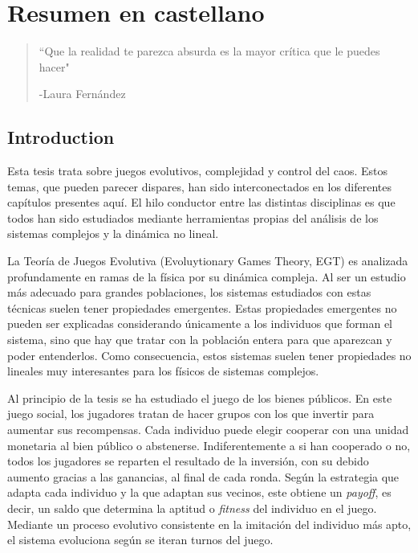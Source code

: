 \chapter{Resumen en castellano}



\begin{quotation}
	\vspace{-3cm}
    \begin{flushright}
    \begin{minipage}[t][5cm][b]{0.5\textwidth}
    { ``Que la realidad te parezca absurda es la mayor crítica que le puedes hacer"}
    
    \bigskip
    
    -{\small  Laura Fernández}
    \end{minipage}
    \end{flushright}
    
    \vspace{0.5cm}
\end{quotation}




\section{Introduction}

Esta tesis trata sobre juegos evolutivos, complejidad y control del caos. Estos temas, que pueden parecer dispares, han sido interconectados en los diferentes capítulos presentes aquí. El hilo conductor entre las distintas disciplinas es que todos han sido estudiados mediante herramientas propias del análisis de los sistemas complejos y la dinámica no lineal. 

La Teoría de Juegos Evolutiva (Evoluytionary Games Theory, EGT) es analizada profundamente en ramas de la física por su dinámica compleja. Al ser un estudio más adecuado para grandes poblaciones, los sistemas estudiados con estas técnicas suelen tener propiedades emergentes. Estas propiedades emergentes no pueden ser explicadas considerando únicamente a los individuos que forman el sistema, sino que hay que tratar con la población entera para que aparezcan y poder entenderlos. Como consecuencia, estos sistemas suelen tener propiedades no lineales muy interesantes para los físicos de sistemas complejos.

Al principio de la tesis se ha estudiado el juego de los bienes públicos. En este juego social, los jugadores tratan de hacer grupos con los que invertir para aumentar sus recompensas. Cada individuo puede elegir cooperar con una unidad monetaria al bien público o abstenerse. Indiferentemente a si han cooperado o no, todos los jugadores se reparten el resultado de la inversión, con su debido aumento gracias a las ganancias, al final de cada ronda. Según la estrategia que adapta cada individuo y la que adaptan sus vecinos, este obtiene un \textit{payoff}, es decir, un saldo que determina la aptitud o \textit{fitness} del individuo en el juego. Mediante un proceso evolutivo consistente en la imitación del individuo más apto, el sistema evoluciona según se iteran turnos del juego.

